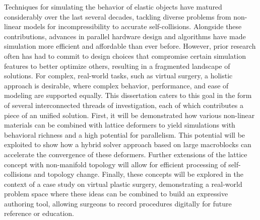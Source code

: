 
Techniques for simulating the behavior of elastic objects have matured
considerably over the last several decades, tackling diverse problems
from non-linear models for incompressibility to accurate
self-collisions. Alongside these contributions, advances in parallel
hardware design and algorithms have made simulation more efficient and
affordable than ever before. However, prior research often has had to
commit to design choices that compromise certain simulation features
to better optimize others, resulting in a fragmented landscape of
solutions. For complex, real-world tasks, such as virtual surgery, a
holistic approach is desirable, where complex behavior, performance,
and ease of modeling are supported equally. This dissertation caters
to this goal in the form of several interconnected threads of
investigation, each of which contributes a piece of an unified
solution. First, it will be demonstrated how various non-linear
materials can be combined with lattice deformers to yield simulations
with behavioral richness and a high potential for parallelism. This
potential will be exploited to show how a hybrid solver approach based
on large macroblocks can accelerate the convergence of these
deformers. Further extensions of the lattice concept with non-manifold
topology will allow for efficient processing of self-collisions and
topology change. Finally, these concepts will be explored in the
context of a case study on virtual plastic surgery, demonstrating a
real-world problem space where these ideas can be combined to build an
expressive authoring tool, allowing surgeons to record procedures
digitally for future reference or education.


